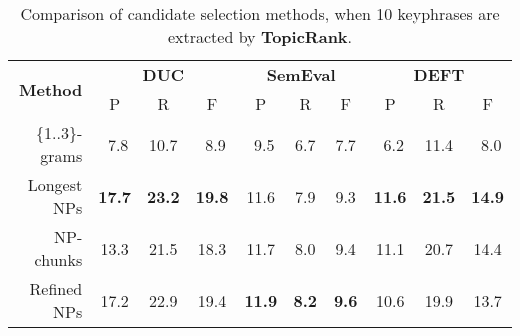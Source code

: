       \begin{table}
        \centering
        \begin{tabular}{rccccccccc}
          \toprule
          \multirow{2}{*}[-2pt]{\textbf{Method}} & \multicolumn{3}{c}{\textbf{DUC}} & \multicolumn{3}{c}{\textbf{SemEval}} & \multicolumn{3}{c}{\textbf{DEFT}}\\
          \cmidrule(r){2-4}\cmidrule(lr){5-7}\cmidrule(l){8-10}
          & P & R & F & P & R & F & P & R & F\\
          \midrule
          \{1..3\}-grams & $~~$7.8 & 10.7 & $~~$8.9 & $~~$9.5 & $~~$6.7 & $~~$7.7 & $~~$6.2 & 11.4 & $~~$8.0\\
          Longest NPs & \textbf{17.7} & \textbf{23.2} & \textbf{19.8} & 11.6 & $~~$7.9 & $~~$9.3 & \textbf{11.6} & \textbf{21.5} & \textbf{14.9}\\
          NP-chunks & 13.3 & 21.5 & 18.3 & 11.7 & $~~$8.0 & $~~$9.4 & 11.1 & 20.7 & 14.4\\
          Refined NPs & 17.2 & 22.9 & 19.4 & \textbf{11.9} & \textbf{$~~$8.2} & \textbf{$~~$9.6} & 10.6 & 19.9 & 13.7\\
          \bottomrule
        \end{tabular}
        \caption{Comparison of candidate selection methods, when 10 keyphrases
                 are extracted by \textbf{TopicRank}.
                 \label{tab:topicrank_results}}
      \end{table}
